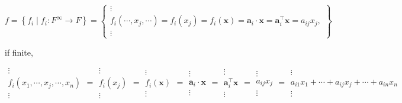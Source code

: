 \documentclass[
]{book}
\theoremstyle{definition}
\theoremstyle{definition}
\theoremstyle{definition}
\theoremstyle{definition}
\theoremstyle{remark}
\begin{document}
\[
f=\left\{ f_{{\scriptscriptstyle i}}\middle|f_{{\scriptscriptstyle i}}:F^{\infty}\rightarrow F\right\} =\left\{ \begin{array}{c}
\vdots\\
f_{{\scriptscriptstyle i}}\left(\cdots,x_{{\scriptscriptstyle j}},\cdots\right)=f_{{\scriptscriptstyle i}}\left(x_{{\scriptscriptstyle j}}\right)=f_{{\scriptscriptstyle i}}\left(\boldsymbol{x}\right)=\boldsymbol{a}_{{\scriptscriptstyle i}}\cdot\boldsymbol{x}=\boldsymbol{a}_{{\scriptscriptstyle i}}^{\intercal}\boldsymbol{x}=a_{{\scriptscriptstyle ij}}x_{{\scriptscriptstyle j}},\\
\vdots
\end{array}\right\} 
\]

if finite,

\[
\begin{array}{c}
\vdots\\
f_{{\scriptscriptstyle i}}\left(x_{{\scriptscriptstyle 1}},\cdots,x_{{\scriptscriptstyle j}},\cdots,x_{{\scriptscriptstyle n}}\right)\\
\vdots
\end{array}=\begin{array}{c}
\vdots\\
f_{{\scriptscriptstyle i}}\left(x_{{\scriptscriptstyle j}}\right)\\
\vdots
\end{array}=\begin{array}{c}
\vdots\\
f_{{\scriptscriptstyle i}}\left(\boldsymbol{x}\right)\\
\vdots
\end{array}=\begin{array}{c}
\vdots\\
\boldsymbol{a}_{{\scriptscriptstyle i}}\cdot\boldsymbol{x}\\
\vdots
\end{array}=\begin{array}{c}
\vdots\\
\boldsymbol{a}_{{\scriptscriptstyle i}}^{\intercal}\boldsymbol{x}\\
\vdots
\end{array}=\begin{array}{c}
\vdots\\
a_{{\scriptscriptstyle ij}}x_{{\scriptscriptstyle j}}\\
\vdots
\end{array}=\begin{array}{c}
\vdots\\
a_{{\scriptscriptstyle i1}}x_{{\scriptscriptstyle 1}}+\cdots+a_{{\scriptscriptstyle ij}}x_{{\scriptscriptstyle j}}+\cdots+a_{{\scriptscriptstyle in}}x_{{\scriptscriptstyle n}}\\
\vdots
\end{array}
\]
\end{document}
